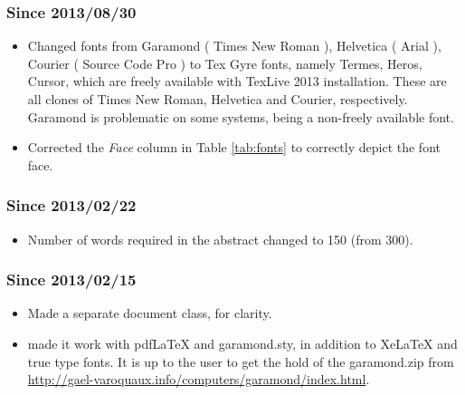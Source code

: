 \subsubsection{Since 2013/08/30}
\begin{itemize}
\item Changed fonts from Garamond ( Times New Roman ), Helvetica ( Arial ), Courier ( Source Code Pro ) to Tex Gyre fonts, namely Termes, Heros, Cursor, which are freely available with TexLive 2013 installation. These are all clones of Times New Roman, Helvetica and Courier, respectively. Garamond is problematic on some systems, being a non-freely available font.
\item Corrected the \textit{Face} column in Table \ref{tab:fonts} to correctly depict the font face.
\end{itemize}

\subsubsection{Since 2013/02/22}
\begin{itemize}
\item Number of words required in the abstract changed to 150 (from 300).
\end{itemize}

\subsubsection{Since 2013/02/15}
\begin{itemize}
\item Made a separate document class, for clarity.
\item made it work with pdfLaTeX and garamond.sty, in addition to XeLaTeX and true type fonts. It is up to the user to get the hold of the garamond.zip from \url{http://gael-varoquaux.info/computers/garamond/index.html}.
\end{itemize}